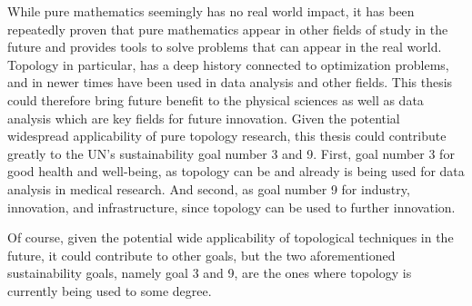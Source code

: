 While pure mathematics seemingly has no real world impact, it has been repeatedly proven that pure mathematics appear in other fields of study in the future and provides tools to solve problems that can appear in the real world. Topology in particular, has a deep history connected to optimization problems, and in newer times have been used in data analysis and other fields. This thesis could therefore bring future benefit to the physical sciences as well as data analysis which are key fields for future innovation. Given the potential widespread applicability of pure topology research, this thesis could contribute greatly to the UN's sustainability goal number 3 and 9. First, goal number 3 for good health and well-being, as topology can be and already is being used for data analysis in medical research. And second, as goal number 9 for industry, innovation, and infrastructure, since topology can be used to further innovation.

Of course, given the potential wide applicability of topological techniques in the future, it could contribute to other goals, but the two aforementioned sustainability goals, namely goal 3 and 9, are the ones where topology is currently being used to some degree.